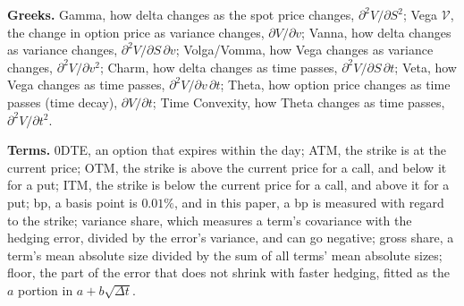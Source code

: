 \documentclass[11pt]{article}
\begin{document}
\noindent\textbf{Greeks.}\quad
Gamma, how delta changes as the spot price changes, $\partial^2 V/\partial S^2$;
Vega $\mathcal{V}$, the change in option price as variance changes, $\partial V/\partial v$;
Vanna, how delta changes as variance changes, $\partial^2 V/\partial S\,\partial v$;
Volga/Vomma, how Vega changes as variance changes, $\partial^2 V/\partial v^2$;
Charm, how delta changes as time passes, $\partial^2 V/\partial S\,\partial t$;
Veta, how Vega changes as time passes, $\partial^2 V/\partial v\,\partial t$;
Theta, how option price changes as time passes (time decay), $\partial V/\partial t$;
Time Convexity, how Theta changes as time passes, $\partial^2 V/\partial t^2$.\par
\noindent\textbf{Terms.}\quad
0DTE, an option that expires within the day;
ATM, the strike is at the current price;
OTM, the strike is above the current price for a call, and below it for a put;
ITM, the strike is below the current price for a call, and above it for a put;
bp, a basis point is $0.01\%$, and in this paper, a bp is measured with regard to the strike;
variance share, which measures a term's covariance with the hedging error, divided by the error's variance, and can go negative;
gross share, a term's mean absolute size divided by the sum of all terms' mean absolute sizes;
floor, the part of the error that does not shrink with faster hedging, fitted as the $a$ portion in $a + b\sqrt{\Delta t}$.\par

\clearpage
\end{document}
